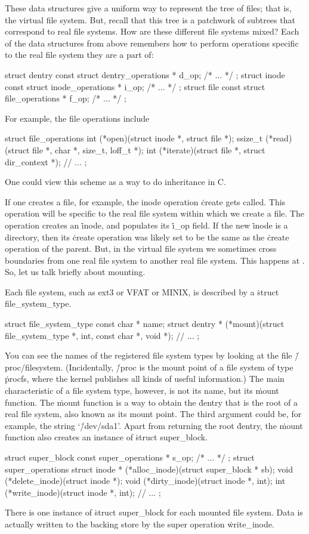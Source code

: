 These data structures give a uniform way to represent the tree of files;
  that is, the virtual file system.
But, recall that this tree is a patchwork of subtrees that correspond
  to real file systems.
How are these different file systems mixed?
Each of the data structures from above remembers how to perform operations
  specific to the real file system they are a part of:
\begin{ccode}
struct dentry { const struct dentry_operations * d_op; /* ... */ };
struct inode { const struct inode_operations * i_op; /* ... */ };
struct file { const struct file_operations * f_op; /* ... */ };
\end{ccode}
For example, the file operations include
\begin{ccode}
struct file_operations {
  int (*open)(struct inode *, struct file *);
  ssize_t (*read)(struct file *, char *, size_t, loff_t *);
  int (*iterate)(struct file *, struct dir_context *);
  // ...
};
\end{ccode}
One could view this scheme as a way to do inheritance in C\null.

If one creates a file, for example, the inode operation \.{create} gets called.
This operation will be specific to the real file system
  within which we create a file.
The operation creates an \.{inode}, and populates its \.{i\_op} field.
If the new \.{inode} is a directory,
  then its \.{create} operation was likely set to be the same
  as the \.{create} operation of the parent.
But, in the virtual file system we sometimes cross boundaries
  from one real file system to another real file system.
This happens at .
So, let us talk briefly about mounting.

Each file system, such as ext3 or VFAT or MINIX,
  is described by a \.{struct file\_system\_type}.
\begin{ccode}
struct file_system_type {
  const char * name;
  struct dentry * (*mount)(struct file_system_type *, int, const char *, void *);
  // ...
};
\end{ccode}
You can see the names of the registered file system types by looking
  at the file \.{/proc/filesystem}.
(Incidentally, \.{/proc} is the mount point of a file system of type \.{procfs},
  where the kernel publishes all kinds of useful information.)
The main characteristic of a file system type, however, is not its name,
  but its \.{mount} function.
The \.{mount} function is a way to obtain the \.{dentry}
  that is the root of a real file system,
  also known as its mount point.
The third argument could be, for example, the string `\.{/dev/sda1}'.
Apart from returning the root \.{dentry},
  the \.{mount} function also creates an instance of \.{struct super\_block}.
\begin{ccode}
struct super_block { const super_operations * s_op; /* ... */ };
struct super_operations {
  struct inode * (*alloc_inode)(struct super_block * sb);
  void (*delete_inode)(struct inode *);
  void (*dirty_inode)(struct inode *, int);
  int (*write_inode)(struct inode *, int);
  // ...
};
\end{ccode}
There is one instance of \.{struct super\_block} for each mounted file system.
Data is actually written to the backing store by the super operation
  \.{write\_inode}.


